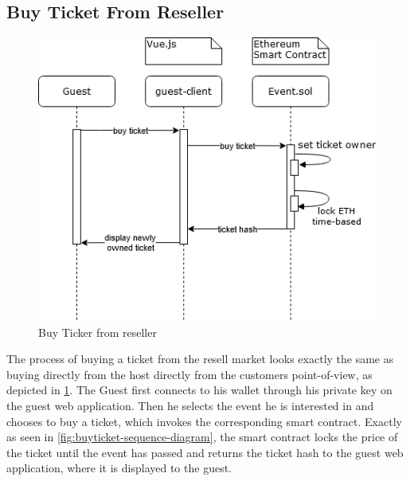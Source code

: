 \subsection{Buy Ticket From Reseller}
\begin{figure}[H]
    \centering
    \includegraphics[width=16cm]{design/diagrams/BuyTicketFromResell.png}
    \caption{Buy Ticker from reseller}
    \label{fig:buyFromResell}
\end{figure}
The process of buying a ticket from the resell market looks exactly the same as buying directly from the host directly from the customers point-of-view, as depicted in \ref{fig:buyFromResell}. The Guest first connects to his wallet through his private key on the guest web application. Then he selects the event he is interested in and chooses to buy a ticket, which invokes the corresponding smart contract. Exactly as seen in \ref{fig:buyticket-sequence-diagram}, the smart contract locks the price of the ticket until the event has passed and returns the ticket hash to the guest web application, where it is displayed to the guest.

